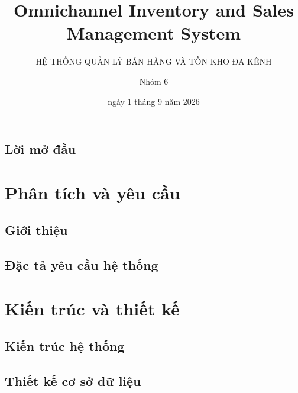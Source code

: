 \documentclass[letterpaper,11pt,leqno]{book}
\begin{document}
\title{Omnichannel Inventory and Sales Management System}

\subtitle{HỆ THỐNG QUẢN LÝ BÁN HÀNG VÀ TỒN KHO ĐA KÊNH}

\author{Nhóm 6}

\date{ngày 1 tháng 9 năm 2026}

\begin{titlepage}
\maketitle
\end{titlepage}

\frontmatter

\tableofcontents

\chapter{Lời mở đầu}



\mainmatter

\part{Phân tích và yêu cầu}\label{p:requirements}

\chapter{Giới thiệu}\label{c:introduction}


\chapter{Đặc tả yêu cầu hệ thống}\label{c:requirements}


\part{Kiến trúc và thiết kế}\label{p:architecture}

\chapter{Kiến trúc hệ thống}\label{c:architecture}


\chapter{Thiết kế cơ sở dữ liệu}\label{c:database}

\end{document}
